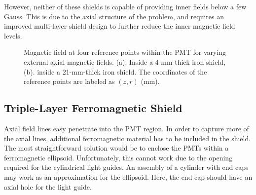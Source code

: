 \documentclass[12pt]{article}
\begin{document}
However, neither of these shields is capable of providing inner fields below 
a few Gauss. This is due to the axial structure of the problem, and requires an
improved multi-layer shield design to further reduce the inner magnetic field 
levels. 

\begin{figure}[ht]
\centering
{}
\qquad
{}
\caption{Magnetic field at four reference points within the PMT for varying external 
axial magnetic fields. (a). Inside a 4-mm-thick iron shield, (b). inside a 21-mm-thick 
iron shield. The coordinates of the reference points are labeled as $(z,r)$ (mm).}
\label{Upstream_Iron_4mm}
\end{figure}

\subsection{Triple-Layer Ferromagnetic Shield}
\label{sec:tlfs}

Axial field lines easy penetrate into the PMT region. In order to capture more of 
the axial lines, additional ferromagnetic material has to be included in the 
shield. The most straightforward solution would be to enclose the PMTs within a 
ferromagnetic ellipsoid. Unfortunately, this cannot work due to the opening 
required for the cylindrical light guides. An assembly of a cylinder with end caps 
may work as an approximation for the ellipsoid. Here, the end cap should have an 
axial hole for the light guide. 
 
\end{document}
